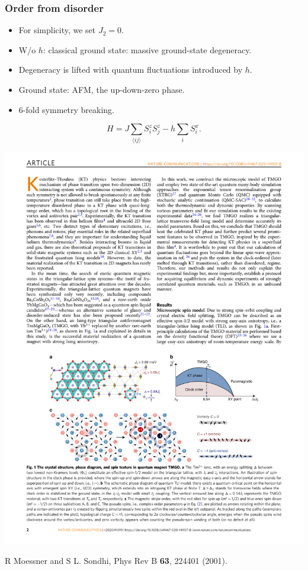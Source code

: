 \documentclass[xcolor=table, aspectratio=1610,ignorenonframetext]{beamer}
\begin{document}
\begin{frame}
  \frametitle{Order from disorder}
  \begin{itemize}
    \item For simplicity, we set $J_2=0$.
    \item W/o $h$: classical ground state: massive ground-state degeneracy.
    \item Degeneracy is lifted with quantum fluctuations introduced by $h$.
    \item Ground state: AFM, the up-down-zero phase.
    \item 6-fold symmetry breaking.
  \end{itemize}
  \[H = J\sum_{\langle ij\rangle}S_i^zS_j^z - h\sum_iS_i^x. \]

  \begin{center}
    \includegraphics{lattice-afm}
  \end{center}
  {\footnotesize R Moessner and S L. Sondhi, Phys Rev B \textbf{63}, 224401 (2001).}
\end{frame}
\end{document}
